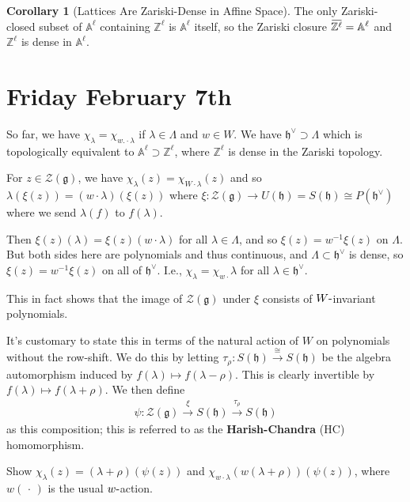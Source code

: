 \documentclass[11pt]{scrartcl}
\theoremstyle{definition}
\theoremstyle{theorem}
\newtheorem{corollary}[theorem]{Corollary}
\theoremstyle{proof}
\theoremstyle{definition}
\theoremstyle{break}
\theoremstyle{problem}
\providecommand{\tightlist}{%
  \setlength{\itemsep}{0pt}\setlength{\parskip}{0pt}}
\renewcommand{\AA}[0]{{\mathbb{A}}}
\newcommand{\ZZ}[0]{{\mathbb{Z}}}
\newcommand{\dash}[0]{{\hbox{-}}}
\newcommand{\dual}[0]{^\vee}
\newcommand{\inv}[0]{^{-1}}
\newcommand{\lieg}[0]{{\mathfrak{g}}}
\newcommand{\lieh}[0]{{\mathfrak{h}}}
\newcommand{\mapsvia}[1]{\xrightarrow{#1}}
\newcommand{\mcz}[0]{{\mathcal{Z}}}
\newcommand{\wait}[0]{{\,\cdot\,}}
\renewcommand{\bar}[1]{\mkern 1.5mu\overline{\mkern-1.5mu#1\mkern-1.5mu}\mkern 1.5mu}
\renewcommand{\to}[0]{\longrightarrow}
\begin{document}
\begin{corollary}[Lattices Are Zariski-Dense in Affine Space]

The only Zariski-closed subset of \(\AA^\ell\) containing \(\ZZ^\ell\)
is \(\AA^\ell\) itself, so the Zariski closure
\(\bar{\ZZ^\ell} = \AA^\ell\) and \(\ZZ^\ell\) is dense in
\(\AA^\ell\).\end{corollary}

\hypertarget{friday-february-7th}{%
\section{Friday February 7th}\label{friday-february-7th}}

So far, we have \(\chi_\lambda = \chi_{w.\cdot \lambda}\) if
\(\lambda \in \Lambda\) and \(w\in W\). We have
\(\lieh\dual \supset \Lambda\) which is topologically equivalent to
\(\AA^\ell \supset \ZZ^\ell\), where \(\ZZ^\ell\) is dense in the
Zariski topology.

For \(z\in \mcz(\lieg)\), we have
\(\chi_\lambda(z) = \chi_{W\cdot \lambda} (z)\) and so
\(\lambda(\xi(z)) = (w\cdot \lambda )(\xi(z))\) where
\(\xi: \mcz(\lieg) \to U(\lieh) = S(\lieh) \cong P(\lieh\dual)\) where
we send \(\lambda(f)\) to \(f(\lambda)\).

Then \(\xi(z)(\lambda) = \xi(z)(w\cdot \lambda)\) for all
\(\lambda \in \Lambda\), and so \(\xi(z) = w\inv \xi(z)\) on
\(\Lambda\). But both sides here are polynomials and thus continuous,
and \(\Lambda \subset \lieh\dual\) is dense, so
\(\xi(z) = w\inv \xi(z)\) on all of \(\lieh\dual\). I.e.,
\(\chi_\lambda = \chi_{w\cdot } \lambda\) for all
\(\lambda \in \lieh\dual\).

This in fact shows that the image of \(\mcz(\lieg)\) under \(\xi\)
consists of \(W\dash\)invariant polynomials.

It's customary to state this in terms of the natural action of \(W\) on
polynomials without the row-shift. We do this by letting
\(\tau_\rho: S(\lieh) \mapsvia{\cong} S(\lieh)\) be the algebra
automorphism induced by \(f(\lambda) \mapsto f(\lambda - \rho)\). This
is clearly invertible by \(f(\lambda) \mapsto f(\lambda + \rho)\). We
then define
\begin{align*}\psi: \mcz(\lieg) \mapsvia{\xi} S(\lieh) \mapsvia{\tau_\rho} S(\lieh)\end{align*}
as this composition; this is referred to as the \textbf{Harish-Chandra}
(HC) homomorphism.

\begin{description}
\tightlist
\item[Exercise]
Show \(\chi_\lambda(z) = (\lambda + \rho) (\psi(z))\) and
\(\chi_{w\cdot \lambda} (w(\lambda+\rho))(\psi(z))\), where \(w(\wait)\)
is the usual \(w\dash\)action.
\end{description}
\end{document}
